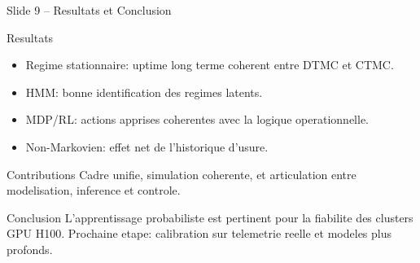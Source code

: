 \documentclass[aspectratio=169]{beamer}
\begin{document}
\begin{frame}{Slide 9 -- Resultats et Conclusion}
\begin{block}{Resultats}
\begin{itemize}
    \item Regime stationnaire: uptime long terme coherent entre DTMC et CTMC.
    \item HMM: bonne identification des regimes latents.
    \item MDP/RL: actions apprises coherentes avec la logique operationnelle.
    \item Non-Markovien: effet net de l'historique d'usure.
\end{itemize}
\end{block}

\begin{block}{Contributions}
Cadre unifie, simulation coherente, et articulation entre modelisation, inference et controle.
\end{block}

\begin{alertblock}{Conclusion}
L'apprentissage probabiliste est pertinent pour la fiabilite des clusters GPU H100.
Prochaine etape: calibration sur telemetrie reelle et modeles plus profonds.
\end{alertblock}
\end{frame}
\end{document}
